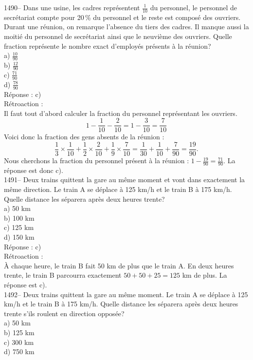 1490-- Dans une usine, les cadres repr\'esentent $\frac{1}{10}$ du
personnel, le personnel de secr\'etariat compte pour 20\,\% du
personnel et le reste est compos\'e des ouvriers. Durant une
r\'eunion, on remarque l'absence du tiers des cadres. Il manque
aussi la moiti\'e du personnel de secr\'etariat ainsi que le
neuvi\`eme des ouvriers. Quelle fraction repr\'esente le nombre
exact d'employ\'es pr\'esents \`a la r\'eunion?\\
a) $\frac{10}{90}$\\[3mm]
b) $\frac{12}{90}$\\[3mm]
c) $\frac{71}{90}$\\[3mm]
d) $\frac{78}{90}$\\

R\'eponse : c)\\

R\'etroaction :\\
Il faut tout d'abord calculer la fraction du personnel
repr\'esentant les ouvriers.
$$1-\frac{1}{10}-\frac{2}{10}=1-\frac{3}{10}=\frac{7}{10}$$
\vskip 10pt \noindent Voici donc la fraction des gens absents de la
r\'eunion :
$$\frac{1}{3}\times\frac{1}{10} +
\frac{1}{2}\times\frac{2}{10}+\frac{1}{9}\times\frac{7}{10} =
\frac{1}{30}+\frac{1}{10}+\frac{7}{90}=\frac{19}{90}.$$ Nous
cherchons la fraction du personnel pr\'esent \`a la r\'eunion :
$1-\frac{19}{90}=\frac{71}{90}$. La r\'eponse est donc c).\\

1491-- Deux trains quittent la gare au m\^eme moment et vont dans exactement la m\^eme direction. Le train A se
d\'eplace \`a 125 km/h et le train B  \`a 175 km/h. Quelle distance
les s\'eparera
apr\`es deux heures trente?\\
a) 50 km\\
b) 100 km\\
c) 125 km\\
d) 150 km\\

R\'eponse : c)\\

R\'etroaction :\\
\`A chaque heure, le train B fait 50 km de plus que le train A.
En deux heures trente, le train B parcourra exactement $50+50+25=125$ km de
plus. La r\'eponse est c).\\

1492-- Deux trains quittent la gare au m\^eme moment. Le train A se
d\'eplace \`a 125 km/h et le train B \`a 175 km/h. Quelle distance
les s\'eparera apr\`es deux heures trente s'ils roulent en direction
oppos\'ee?\\
a) 50 km\\
b) 125 km\\
c) 300 km\\
d) 750 km\\

